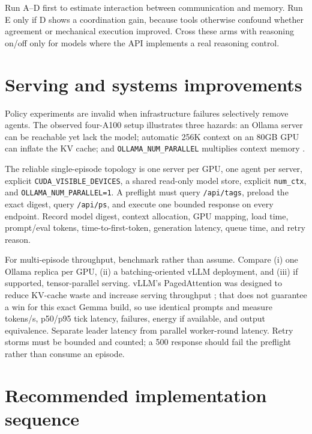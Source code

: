 \documentclass[11pt]{article}
\begin{document}
Run A--D first to estimate interaction between communication and memory.  Run E only if D shows a
coordination gain, because tools otherwise confound whether agreement or mechanical execution
improved.  Cross these arms with reasoning on/off only for models where the API implements a real
reasoning control.

\section{Serving and systems improvements}

Policy experiments are invalid when infrastructure failures selectively remove agents.  The observed
four-A100 setup illustrates three hazards: an Ollama server can be reachable yet lack the model;
automatic 256K context on an 80GB GPU can inflate the KV cache; and
\texttt{OLLAMA\_NUM\_PARALLEL} multiplies context memory \cite{ollamafaq,ollamacontext}.

The reliable single-episode topology is one server per GPU, one agent per server, explicit
\nolinkurl{CUDA_VISIBLE_DEVICES}, a shared read-only model store, explicit \texttt{num\_ctx}, and
\nolinkurl{OLLAMA_NUM_PARALLEL=1}.  A preflight must query \texttt{/api/tags}, preload the exact
digest, query \texttt{/api/ps}, and execute one bounded response on every endpoint.  Record model
digest, context allocation, GPU mapping, load time, prompt/eval tokens, time-to-first-token, generation
latency, queue time, and retry reason.

For multi-episode throughput, benchmark rather than assume.  Compare (i) one Ollama replica per GPU,
(ii) a batching-oriented vLLM deployment, and (iii) if supported, tensor-parallel serving.  vLLM's
PagedAttention was designed to reduce KV-cache waste and increase serving throughput
\cite{kwon2023vllm}; that does not guarantee a win for this exact Gemma build, so use identical
prompts and measure tokens/s, p50/p95 tick latency, failures, energy if available, and output
equivalence.  Separate leader latency from parallel worker-round latency.  Retry storms must be
bounded and counted; a 500 response should fail the preflight rather than consume an episode.

\section{Recommended implementation sequence}
\end{document}
